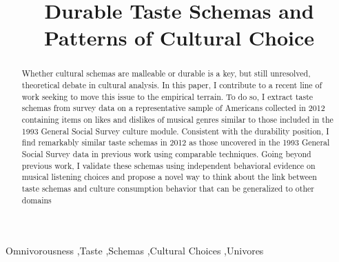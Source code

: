 \documentclass[preprint, authoryear,11pt, 3p]{elsarticle}
\begin{document}
\begin{frontmatter}


\title{Durable Taste Schemas and Patterns of Cultural Choice}






\begin{abstract}
Whether cultural schemas are malleable or durable is a key, but still unresolved, theoretical debate in cultural analysis. In this paper, I contribute to a recent line of work seeking to move this issue to the empirical terrain. To do so, I extract taste schemas from survey data on a representative sample of Americans collected in 2012 containing items on likes and dislikes of musical genres similar to those included in the 1993 General Social Survey culture module. Consistent with the durability position, I find remarkably similar taste schemas in 2012 as those uncovered in the 1993 General Social Survey data in previous work using comparable techniques. Going beyond previous work, I validate these schemas using independent behavioral evidence on musical listening choices and propose a novel way to think about the link between taste schemas and culture consumption behavior that can be generalized to other domains
\end{abstract}

\begin{keyword}
Omnivorousness  \sep Taste \sep Schemas \sep Cultural Choices \sep Univores
\end{keyword}

\end{frontmatter}
\newpage
\end{document}
